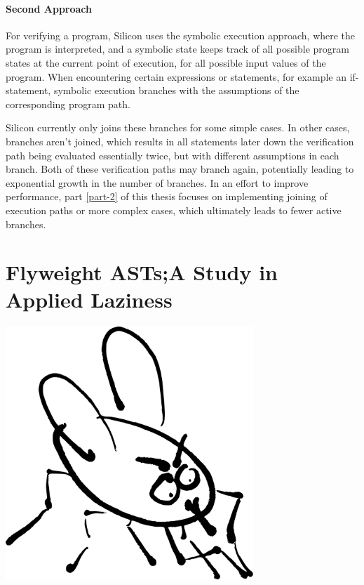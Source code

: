 \documentclass[11pt]{article}
\begin{document}
    \subsection*{Second Approach}

    For verifying a program, Silicon uses the symbolic execution approach, where the program is interpreted,
    and a symbolic state keeps track of all possible program states at the current point of execution, for all
    possible input values of the program. When encountering certain expressions or statements, for example an
    if-statement, symbolic execution branches with the assumptions of the corresponding program path.

    Silicon currently only joins these branches for some simple cases. In other cases,
    branches aren't joined, which results in all statements later down the verification path
    being evaluated essentially twice, but with different assumptions in each branch. Both of these
    verification paths may branch again, potentially leading to exponential growth in the number of branches.
    In an effort to improve performance, part \ref{part-2} of this thesis focuses on implementing 
    joining of execution paths or more complex cases, which ultimately leads to fewer active branches.

    \part{Flyweight ASTs;\newline A Study in Applied Laziness} \label{part-1}
    \begin{center}
        \vspace{3cm}
        \includegraphics[width=0.7\textwidth]{fly}
    \end{center}
\end{document}
